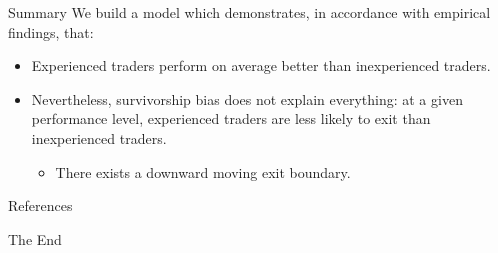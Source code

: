 \documentclass{beamer}
\begin{document}
\begin{frame}{Summary}
We build a model which demonstrates, in accordance with empirical findings, that:
\begin{itemize}
\item Experienced traders perform on average better than inexperienced traders.
\item Nevertheless, survivorship bias does not explain everything: at a given performance level, experienced traders are less likely to exit than inexperienced traders.
\begin{itemize}
	\item There exists a downward moving exit boundary.
\end{itemize}
\end{itemize}
\end{frame}


\begin{frame}[allowframebreaks]{References}
	
	
\end{frame}

\begin{frame}
\Huge{\centerline{The End}}
\end{frame}
\end{document}
